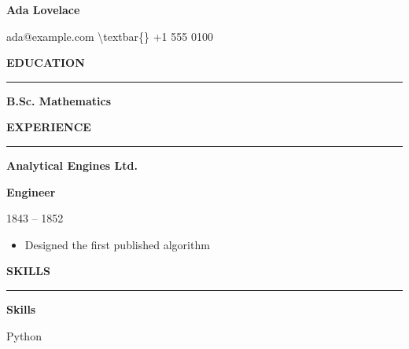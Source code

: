 \documentclass[11pt,a4paper]{article}
\newcommand{\cvsection}[1]{%
  \vspace{1.0em}%
  {\normalsize\bfseries\MakeUppercase{#1}}\par%
  \vspace{-0.4em}\hrule\vspace{0.5em}%
}
\begin{document}
\begin{center}
{\LARGE\bfseries Ada Lovelace \par}
\vspace{0.25em}
{\small ada@example.com \textbackslash{}textbar\{\} +1 555 0100 \par}
\end{center}


\cvsection{ Education }
\vspace{0.25em}
\noindent
\begin{minipage}[t]{0.24\textwidth}
\raggedright
\textbf{ B.Sc. Mathematics }\end{minipage}%
\begin{minipage}[t]{0.73\textwidth}
\raggedright
\end{minipage}
\par
\cvsection{ Experience }
\vspace{0.25em}
\noindent
\begin{minipage}[t]{0.24\textwidth}
\raggedright
\textbf{ Analytical Engines Ltd. }\end{minipage}%
\begin{minipage}[t]{0.73\textwidth}
\raggedright
\textbf{ Engineer }\par{\small 1843 -- 1852 }\par\begin{itemize}[leftmargin=*, nosep, topsep=0.15em]
  \item Designed the first published algorithm
\end{itemize}
\end{minipage}
\par
\cvsection{ Skills }
\vspace{0.25em}
\noindent
\begin{minipage}[t]{0.24\textwidth}
\raggedright
\end{minipage}%
\begin{minipage}[t]{0.73\textwidth}
\raggedright
\textbf{ Skills }\par{\small Python }\par\end{minipage}
\par
\end{document}
